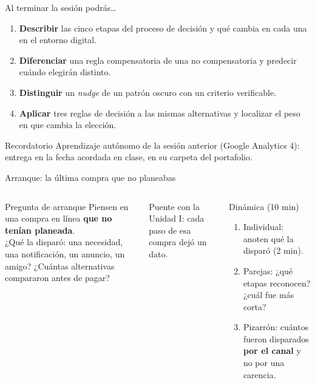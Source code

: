 \documentclass[aspectratio=169,xcolor=dvipsnames]{beamer}
\begin{document}
\begin{frame}{Al terminar la sesión podrás\ldots}
\begin{enumerate}
  \item \textbf{Describir} las cinco etapas del proceso de decisión y qué cambia en cada una en el entorno digital.
  \vspace{4pt}
  \item \textbf{Diferenciar} una regla compensatoria de una no compensatoria y predecir cuándo elegirán distinto.
  \vspace{4pt}
  \item \textbf{Distinguir} un \textit{nudge} de un patrón oscuro con un criterio verificable.
  \vspace{4pt}
  \item \textbf{Aplicar} tres reglas de decisión a las mismas alternativas y localizar el peso en que cambia la elección.
\end{enumerate}
\vspace{6pt}
\begin{alertblock}{Recordatorio}
  Aprendizaje autónomo de la sesión anterior (Google Analytics 4): entrega en la fecha acordada en clase, en su carpeta del portafolio.
\end{alertblock}
\end{frame}

\begin{frame}{Arranque: la última compra que no planeabas}
\begin{columns}[T]
  \begin{exampleblock}{Pregunta de arranque}
    Piensen en una compra en línea \textbf{que no tenían planeada}.\\[4pt]
    ¿Qué la disparó: una necesidad, una notificación, un anuncio, un amigo? ¿Cuántas alternativas compararon antes de pagar?
  \end{exampleblock}
  \vspace{4pt}
  {\small\color{IPNgris} Puente con la Unidad I: cada paso de esa compra dejó un dato.}
  \begin{block}{Dinámica (10 min)}
    \small
    \begin{enumerate}
      \item Individual: anoten qué la disparó (2 min).
      \item Parejas: ¿qué etapas reconocen? ¿cuál fue más corta?
      \item Pizarrón: cuántos fueron disparados \textbf{por el canal} y no por una carencia.
    \end{enumerate}
  \end{block}
\end{columns}
\end{frame}
\end{document}
